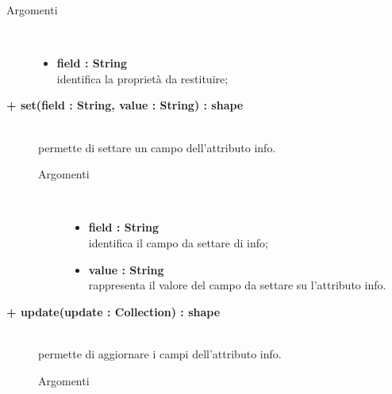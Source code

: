 \begin{description}
\begin{description}
		\begin{description}
			\item[Argomenti] \hfill \\
				\begin{itemize}
				
					\item \textbf{field : String			} \hfill \\
					identifica la proprietà da restituire;
				\end{itemize}
		\end{description}

\end{description}


		\begin{description}
		\item[\textbf{\color{blue}+ set(field : String, value : String) : shape			}] \hfill \\
			permette di settare un campo dell'attributo info.
			
		\begin{description}
			\item[Argomenti] \hfill \\
				\begin{itemize}
				
					\item \textbf{field : String			} \hfill \\
					identifica il campo da settare di info;
					\item \textbf{value : String			} \hfill \\
					rappresenta il valore del campo da settare su l'attributo info.
				\end{itemize}
		\end{description}

\end{description}

\begin{description}
		\item[\textbf{\color{blue}+ update(update : Collection) : shape			}] \hfill \\
			permette di aggiornare i campi dell'attributo info.
			
		\begin{description}
			\item[Argomenti] \hfill \\
				\begin{itemize}
				

\end{itemize}
\end{description}
\end{description}
\end{description}
